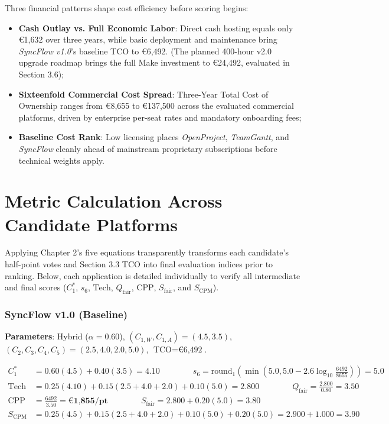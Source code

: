 Three financial patterns shape cost efficiency before scoring begins:
\begin{itemize}[itemsep=1pt,topsep=1pt]
    \item \textbf{Cash Outlay vs. Full Economic Labor}: Direct cash hosting equals only €1,632 over three years, while basic deployment and maintenance bring \textit{SyncFlow v1.0}'s baseline TCO to €6,492. (The planned 400-hour v2.0 upgrade roadmap brings the full Make investment to €24,492, evaluated in Section 3.6);
    \item \textbf{Sixteenfold Commercial Cost Spread}: Three-Year Total Cost of Ownership ranges from €8,655 to €137,500 across the evaluated commercial platforms, driven by enterprise per-seat rates and mandatory onboarding fees;
    \item \textbf{Baseline Cost Rank}: Low licensing places \textit{OpenProject}, \textit{TeamGantt}, and \textit{SyncFlow} cleanly ahead of mainstream proprietary subscriptions before technical weights apply.
\end{itemize}

\newpage

\section{Metric Calculation Across Candidate Platforms}
Applying Chapter 2's five equations transparently transforms each candidate's half-point votes and Section 3.3 TCO into final evaluation indices prior to ranking. Below, each application is detailed individually to verify all intermediate and final scores ($C_1^*$, $s_6$, $\text{Tech}$, $Q_{\text{fair}}$, $\text{CPP}$, $S_{\text{fair}}$, and $S_{\text{CPM}}$).

\subsubsection{SyncFlow v1.0 (Baseline)}
\textbf{Parameters}: Hybrid ($\alpha = 0.60$), $(C_{1,W}, C_{1,A}) = (4.5, 3.5)$, $(C_2, C_3, C_4, C_5) = (2.5, 4.0, 2.0, 5.0)$, $\text{TCO} = \text{€6,492}$.
\begin{small}
\begin{align*}
    C_1^* &= 0.60(4.5) + 0.40(3.5) = \mathbf{4.10} \qquad \qquad
    s_6 = \text{round}_1\!\left(\min\left(5.0, 5.0 - 2.6\log_{10}\!\tfrac{6492}{8655}\right)\right) = \mathbf{5.0} \\
    \text{Tech} &= 0.25(4.10) + 0.15(2.5 + 4.0 + 2.0) + 0.10(5.0) = 2.800 \qquad \qquad
    Q_{\text{fair}} = \tfrac{2.800}{0.80} = \mathbf{3.50} \\
    \text{CPP} &= \tfrac{6492}{3.50} = \mathbf{\text{€1,855/pt}} \qquad \qquad
    S_{\text{fair}} = 2.800 + 0.20(5.0) = \mathbf{3.80} \\
    S_{\text{CPM}} &= 0.25(4.5) + 0.15(2.5 + 4.0 + 2.0) + 0.10(5.0) + 0.20(5.0) = 2.900 + 1.000 = \mathbf{3.90}
\end{align*}
\end{small}

